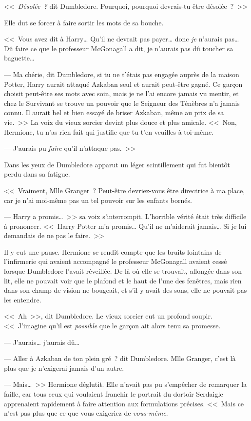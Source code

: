 <<~\emph{Désolée~?} dit Dumbledore. Pourquoi, pourquoi devrais-tu être désolée~?~>>

Elle dut se forcer à faire sortir les mots de sa bouche.

<<~Vous avez dit à Harry… Qu'il ne devrait pas payer… donc \emph{je} n'aurais pas… Dû faire ce que le professeur McGonagall a dit, je n'aurais pas dû toucher sa baguette…

--- Ma chérie, dit Dumbledore, si tu ne t'étais pas engagée auprès de la maison Potter, Harry aurait attaqué Azkaban seul et aurait peut-être gagné. Ce garçon choisit peut-être ses mots avec soin, mais je ne l'ai encore jamais vu mentir, et chez le Survivant se trouve un pouvoir que le Seigneur des Ténèbres n'a jamais connu. Il aurait bel et bien essayé de briser Azkaban, même au prix de sa vie.~>> La voix du vieux sorcier devint plus douce et plus amicale. <<~Non, Hermione, tu n'as rien fait qui justifie que tu t'en veuilles à toi-même.

--- J'aurais pu \emph{faire} qu'il n'attaque pas.~>>

Dans les yeux de Dumbledore apparut un léger scintillement qui fut bientôt perdu dans sa fatigue.

<<~Vraiment, Mlle Granger~? Peut-être devriez-vous être directrice à ma place, car je n'ai moi-même pas un tel pouvoir sur les enfants bornés.

--- Harry a promis…~>> sa voix s'interrompit. L'horrible vérité était très difficile à prononcer. <<~Harry Potter m'a promis… Qu'il ne m'aiderait jamais… Si je lui demandais de ne pas le faire.~>>

Il y eut une pause. Hermione se rendit compte que les bruits lointains de l'infirmerie qui avaient accompagné le professeur McGonagall avaient cessé lorsque Dumbledore l'avait réveillée. De là où elle se trouvait, allongée dans son lit, elle ne pouvait voir que le plafond et le haut de l'une des fenêtres, mais rien dans son champ de vision ne bougeait, et s'il y avait des sons, elle ne pouvait pas les entendre.

<<~Ah~>>, dit Dumbledore. Le vieux sorcier eut un profond soupir. <<~J'imagine qu'il est \emph{possible} que le garçon ait alors tenu sa promesse.

--- J'aurais… j'aurais dû…

--- Aller à Azkaban de ton plein gré~? dit Dumbledore. Mlle Granger, c'est là plus que je n'exigerai jamais d'un autre.

--- Mais…~>> Hermione déglutit. Elle n'avait pas pu s'empêcher de remarquer la faille, car tous ceux qui voulaient franchir le portrait du dortoir Serdaigle apprenaient rapidement à faire attention aux formulations précises. <<~Mais ce n'est pas plus que ce que vous exigeriez de \emph{vous-même}.

